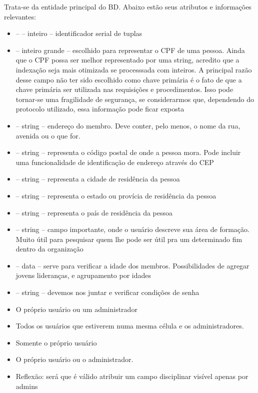 \documentclass{article}
\begin{document}
            Trata-se da entidade principal do BD. Abaixo estão seus atributos e informações
            relevantes:
            \begin{itemize}
                \item \pk --  -- inteiro -- identificador serial de tuplas
                \item {} -- inteiro grande -- escolhido para representar o CPF
                de uma pessoa. Ainda que o CPF possa ser melhor representado por uma string,
                acredito que a indexação seja mais otimizada se processsada com inteiros.
                A principal razão desse campo não ter sido escolhido como chave primária
                é o fato de que a chave primária ser utilizada nas requisições e procedimentos.
                Isso pode tornar-se uma fragilidade de segurança, se considerarmos que, dependendo
                do protocolo utilizado, essa informação pode ficar exposta
                \item {} -- string -- endereço do membro. Deve conter, pelo
                menos, o nome da rua, avenida ou o que for.
                \item {} -- string -- representa o código postal de onde a pessoa
                mora. Pode incluir uma funcionalidade de identificação de endereço através do CEP
                \item {} -- string -- representa a cidade de residência da pessoa
                \item {} -- string -- representa o estado ou provícia de residência
                da pessoa
                \item {} -- string -- representa o país de residência da pessoa
                \item {} -- string -- campo importante, onde o usuário
                descreve sua área de formação. Muito útil para pesquisar quem lhe pode ser
                útil pra um determinado fim dentro da organização
                \item {} -- data -- serve para verificar a idade dos membros.
                Possibilidades de agregar jovens lideranças, e agrupamento por idades
                \item {} -- string -- devemos nos juntar e verificar condições de senha
                \item \criar O próprio usuário ou um administrador
                \item \ler Todos os usuários que estiverem numa mesma
                célula e os administradores.
                \item \atualizar Somente o próprio usuário
                \item \deletar O próprio usuário ou o administrador.
                \item Reflexão: será que é válido atribuir um campo disciplinar visível apenas por
                admins
            \end{itemize}
\end{document}
